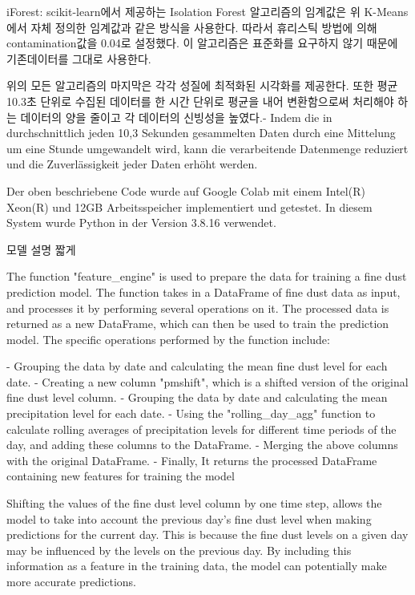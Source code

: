         iForest: scikit-learn에서 제공하는 Isolation Forest 알고리즘의 임계값은 위 K-Means에서 자체 정의한 임계값과 같은 방식을 사용한다. 따라서 휴리스틱 방법에 의해 contamination값을 0.04로 설정했다. 이 알고리즘은 표준화를 요구하지 않기 때문에 기존데이터를 그대로 사용한다.

        위의 모든 알고리즘의 마지막은 각각 성질에 최적화된 시각화를 제공한다. 또한 평균 10.3초 단위로 수집된 데이터를 한 시간 단위로 평균을 내어 변환함으로써 처리해야 하는 데이터의 양을 줄이고 각 데이터의 신빙성을 높였다.- Indem die in durchschnittlich jeden 10,3 Sekunden gesammelten Daten durch eine Mittelung um eine Stunde umgewandelt wird, kann die verarbeitende Datenmenge reduziert und die Zuverlässigkeit jeder Daten erhöht werden.



        Der oben beschriebene Code wurde auf Google Colab mit einem Intel(R) Xeon(R) und 12GB Arbeitsspeicher implementiert und getestet. In diesem System wurde Python in der Version 3.8.16 verwendet.

    모델 설명 짧게
        
        The function "feature_engine" is used to prepare the data for training a fine dust prediction model. The function takes in a DataFrame of fine dust data as input, and processes it by performing several operations on it. The processed data is returned as a new DataFrame, which can then be used to train the prediction model. The specific operations performed by the function include:

        - Grouping the data by date and calculating the mean fine dust level for each date.
        - Creating a new column "pmshift", which is a shifted version of the original fine dust level column.
        - Grouping the data by date and calculating the mean precipitation level for each date.
        - Using the "rolling_day_agg" function to calculate rolling averages of precipitation levels for different time periods of the day, and adding these columns to the DataFrame.
        - Merging the above columns with the original DataFrame.
        - Finally, It returns the processed DataFrame containing new features for training the model
        
        Shifting the values of the fine dust level column by one time step, allows the model to take into account the previous day's fine dust level when making predictions for the current day. This is because the fine dust levels on a given day may be influenced by the levels on the previous day. By including this information as a feature in the training data, the model can potentially make more accurate predictions.
        
